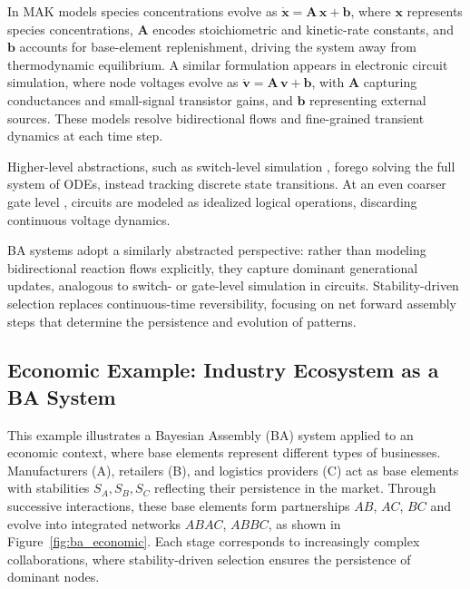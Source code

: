\documentclass[entropy,article,submit,pdftex,moreauthors]{Definitions/mdpi}
\begin{document}
In MAK models species concentrations evolve as 
$\dot{\mathbf{x}} = \mathbf{A}\,\mathbf{x} + \mathbf{b}$, where \(\mathbf{x}\) represents species concentrations, \(\mathbf{A}\) encodes stoichiometric and kinetic-rate constants, and \(\mathbf{b}\) accounts for base-element replenishment, driving the system away from thermodynamic equilibrium. A similar formulation appears in electronic circuit simulation, where node voltages evolve as 
$\dot{\mathbf{v}} = \mathbf{A}\,\mathbf{v} + \mathbf{b}$, with \(\mathbf{A}\) capturing conductances and small-signal transistor gains, and \(\mathbf{b}\) representing external sources. These models resolve bidirectional flows and fine-grained transient dynamics at each time step.

Higher-level abstractions, such as switch-level simulation \cite{AdlerCAD}, forego solving the full system of ODEs, instead tracking discrete state transitions. At an even coarser gate level \cite{FeynmanComp}, circuits are modeled as idealized logical operations, discarding continuous voltage dynamics.

BA systems adopt a similarly abstracted perspective: rather than modeling bidirectional reaction flows explicitly, they capture dominant generational updates, analogous to switch- or gate-level simulation in circuits. Stability-driven selection replaces continuous-time reversibility, focusing on net forward assembly steps that determine the persistence and evolution of patterns.

\subsection{Economic Example: Industry Ecosystem as a BA System}

This example illustrates a Bayesian Assembly (BA) system applied to an economic context, where base elements represent different types of businesses. Manufacturers (A), retailers (B), and logistics providers (C) act as base elements with stabilities \( S_A, S_B, S_C \) reflecting their persistence in the market. Through successive interactions, these base elements form partnerships \( AB \), \( AC \), \( BC \) and evolve into integrated networks \( ABAC \), \( ABBC \), as shown in Figure~\ref{fig:ba_economic}. Each stage corresponds to increasingly complex collaborations, where stability-driven selection ensures the persistence of dominant nodes. 
\end{document}
